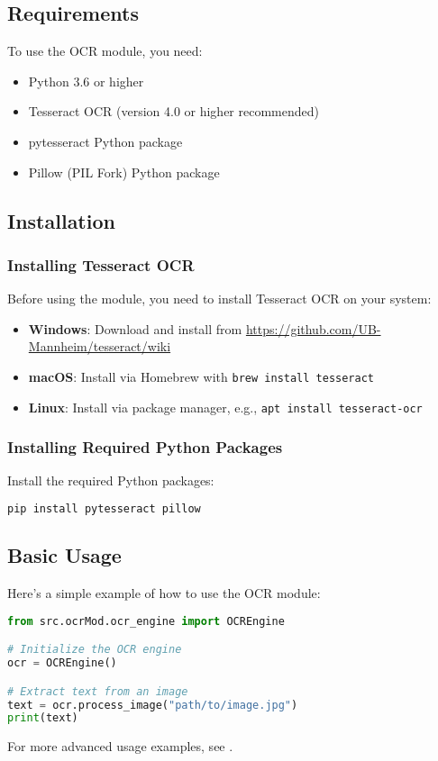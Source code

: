 \subsection{Requirements}

To use the OCR module, you need:

\begin{itemize}
  \item Python 3.6 or higher
  \item Tesseract OCR (version 4.0 or higher recommended)
  \item pytesseract Python package
  \item Pillow (PIL Fork) Python package
\end{itemize}

\subsection{Installation}

\subsubsection{Installing Tesseract OCR}

Before using the module, you need to install Tesseract OCR on your system:

\begin{itemize}
  \item \textbf{Windows}: Download and install from \url{https://github.com/UB-Mannheim/tesseract/wiki}
  \item \textbf{macOS}: Install via Homebrew with \texttt{brew install tesseract}
  \item \textbf{Linux}: Install via package manager, e.g., \texttt{apt install tesseract-ocr}
\end{itemize}

\subsubsection{Installing Required Python Packages}

Install the required Python packages:

\begin{lstlisting}[language=bash]
pip install pytesseract pillow
\end{lstlisting}

\subsection{Basic Usage}

Here's a simple example of how to use the OCR module:

\begin{lstlisting}[language=Python]
from src.ocrMod.ocr_engine import OCREngine

# Initialize the OCR engine
ocr = OCREngine()

# Extract text from an image
text = ocr.process_image("path/to/image.jpg")
print(text)
\end{lstlisting}

For more advanced usage examples, see . 